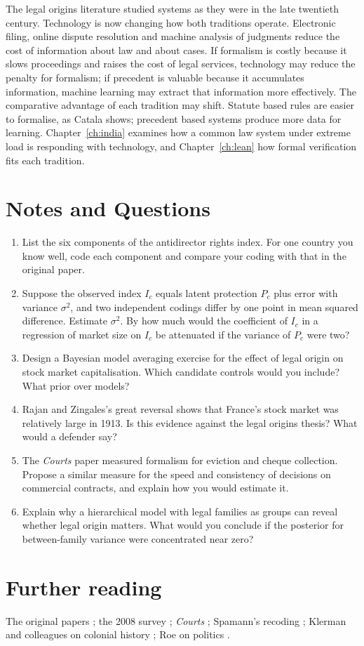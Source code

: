 The legal origins literature studied systems as they were in the late twentieth century. Technology is now changing how both traditions operate. Electronic filing, online dispute resolution and machine analysis of judgments reduce the cost of information about law and about cases. If formalism is costly because it slows proceedings and raises the cost of legal services, technology may reduce the penalty for formalism; if precedent is valuable because it accumulates information, machine learning may extract that information more effectively. The comparative advantage of each tradition may shift. Statute based rules are easier to formalise, as Catala shows; precedent based systems produce more data for learning. Chapter~\ref{ch:india} examines how a common law system under extreme load is responding with technology, and Chapter~\ref{ch:lean} how formal verification fits each tradition.

\section*{Notes and Questions}
\begin{enumerate}[label=\arabic*.]
\item List the six components of the antidirector rights index. For one country you know well, code each component and compare your coding with that in the original paper.
\item Suppose the observed index $I_c$ equals latent protection $P_c$ plus error with variance $\sigma^2$, and two independent codings differ by one point in mean squared difference. Estimate $\sigma^2$. By how much would the coefficient of $I_c$ in a regression of market size on $I_c$ be attenuated if the variance of $P_c$ were two?
\item Design a Bayesian model averaging exercise for the effect of legal origin on stock market capitalisation. Which candidate controls would you include? What prior over models?
\item Rajan and Zingales's great reversal shows that France's stock market was relatively large in 1913. Is this evidence against the legal origins thesis? What would a defender say?
\item The \emph{Courts} paper measured formalism for eviction and cheque collection. Propose a similar measure for the speed and consistency of decisions on commercial contracts, and explain how you would estimate it.
\item Explain why a hierarchical model with legal families as groups can reveal whether legal origin matters. What would you conclude if the posterior for between-family variance were concentrated near zero?
\end{enumerate}

\section*{Further reading}
The original papers \citep{llsv1997,llsv1998}; the 2008 survey \citep{lls2008}; \emph{Courts} \citep{djankov2003}; Spamann's recoding \citep{spamann2010}; Klerman and colleagues on colonial history \citep{klerman2011}; Roe on politics \citep{roe2003}.
